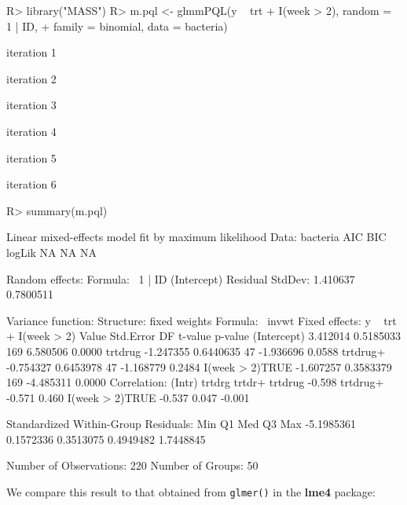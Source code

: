 \documentclass[
]{jss}
\begin{document}
\begin{CodeChunk}
\begin{CodeInput}
R> library("MASS")
R> m.pql <- glmmPQL(y ~ trt + I(week > 2), random = ~ 1 | ID,
+              family = binomial, data = bacteria)
\end{CodeInput}
\begin{CodeOutput}
iteration 1
\end{CodeOutput}
\begin{CodeOutput}
iteration 2
\end{CodeOutput}
\begin{CodeOutput}
iteration 3
\end{CodeOutput}
\begin{CodeOutput}
iteration 4
\end{CodeOutput}
\begin{CodeOutput}
iteration 5
\end{CodeOutput}
\begin{CodeOutput}
iteration 6
\end{CodeOutput}
\begin{CodeInput}
R> summary(m.pql)
\end{CodeInput}
\begin{CodeOutput}
Linear mixed-effects model fit by maximum likelihood
  Data: bacteria 
  AIC BIC logLik
   NA  NA     NA

Random effects:
 Formula: ~1 | ID
        (Intercept)  Residual
StdDev:    1.410637 0.7800511

Variance function:
 Structure: fixed weights
 Formula: ~invwt 
Fixed effects:  y ~ trt + I(week > 2) 
                    Value Std.Error  DF   t-value p-value
(Intercept)      3.412014 0.5185033 169  6.580506  0.0000
trtdrug         -1.247355 0.6440635  47 -1.936696  0.0588
trtdrug+        -0.754327 0.6453978  47 -1.168779  0.2484
I(week > 2)TRUE -1.607257 0.3583379 169 -4.485311  0.0000
 Correlation: 
                (Intr) trtdrg trtdr+
trtdrug         -0.598              
trtdrug+        -0.571  0.460       
I(week > 2)TRUE -0.537  0.047 -0.001

Standardized Within-Group Residuals:
       Min         Q1        Med         Q3        Max 
-5.1985361  0.1572336  0.3513075  0.4949482  1.7448845 

Number of Observations: 220
Number of Groups: 50 
\end{CodeOutput}
\end{CodeChunk}

We compare this result to that obtained from \texttt{glmer()} in the
\textbf{lme4} package:
\end{document}
